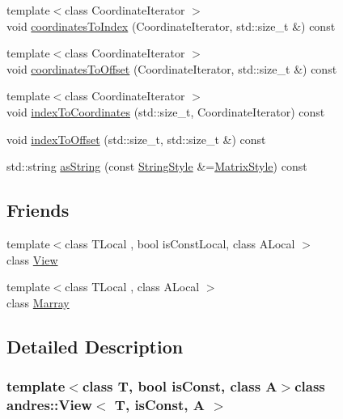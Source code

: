 \begin{DoxyCompactItemize}
{\footnotesize template$<$class Coordinate\+Iterator $>$ }\\void \hyperlink{classandres_1_1View_aaaf0d7e0d18c8ce235da39d006abfb44}{coordinates\+To\+Index} (Coordinate\+Iterator, std\+::size\+\_\+t \&) const 
\item 
{\footnotesize template$<$class Coordinate\+Iterator $>$ }\\void \hyperlink{classandres_1_1View_aae65d4fe9cb58845479be7ea4cbb7591}{coordinates\+To\+Offset} (Coordinate\+Iterator, std\+::size\+\_\+t \&) const 
\item 
{\footnotesize template$<$class Coordinate\+Iterator $>$ }\\void \hyperlink{classandres_1_1View_aac74ad12de420f62a474ebed05e06640}{index\+To\+Coordinates} (std\+::size\+\_\+t, Coordinate\+Iterator) const 
\item 
void \hyperlink{classandres_1_1View_abe37dcbd69af25882d45bdff5745e95f}{index\+To\+Offset} (std\+::size\+\_\+t, std\+::size\+\_\+t \&) const 
\item 
std\+::string \hyperlink{classandres_1_1View_a2c1774da3d066b97932ea861f845d95c}{as\+String} (const \hyperlink{namespaceandres_a69f07c437d156c7028c7d619e566281f}{String\+Style} \&=\hyperlink{namespaceandres_a69f07c437d156c7028c7d619e566281fa8b1efd8fc40539ba5b5255b46440eeaf}{Matrix\+Style}) const 
\end{DoxyCompactItemize}
\subsection*{Friends}
\begin{DoxyCompactItemize}
\item 
{\footnotesize template$<$class T\+Local , bool is\+Const\+Local, class A\+Local $>$ }\\class \hyperlink{classandres_1_1View_a2658181be4befdf722462ab951ba8a67}{View}
\item 
{\footnotesize template$<$class T\+Local , class A\+Local $>$ }\\class \hyperlink{classandres_1_1View_aa5a68966149f255e52d7902758b0e002}{Marray}
\end{DoxyCompactItemize}


\subsection{Detailed Description}
\subsubsection*{template$<$class T, bool is\+Const, class A$>$class andres\+::\+View$<$ T, is\+Const, A $>$}

